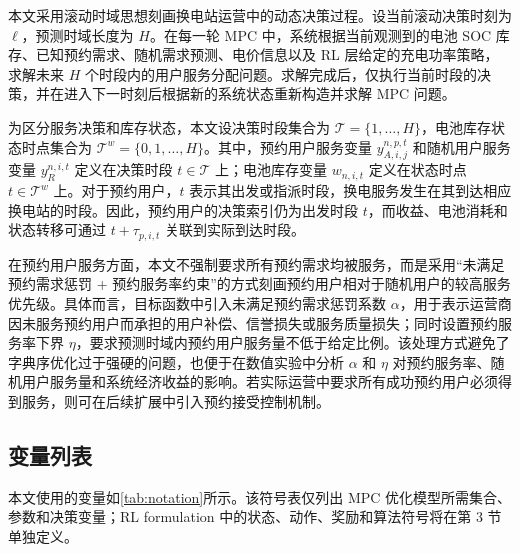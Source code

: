\documentclass[12pt,hyperref,a4paper,UTF8]{ctexart}
\begin{document}
本文采用滚动时域思想刻画换电站运营中的动态决策过程。设当前滚动决策时刻为 $\ell$，预测时域长度为 $H$。在每一轮 MPC 中，系统根据当前观测到的电池 SOC 库存、已知预约需求、随机需求预测、电价信息以及 RL 层给定的充电功率策略，求解未来 $H$ 个时段内的用户服务分配问题。求解完成后，仅执行当前时段的决策，并在进入下一时刻后根据新的系统状态重新构造并求解 MPC 问题。

为区分服务决策和库存状态，本文设决策时段集合为 $\mathcal{T}=\{1,\ldots,H\}$，电池库存状态时点集合为 $\mathcal{T}^{w}=\{0,1,\ldots,H\}$。其中，预约用户服务变量 $y_{A,i,j}^{n,p,t}$ 和随机用户服务变量 $y_R^{n,i,t}$ 定义在决策时段 $t\in\mathcal{T}$ 上；电池库存变量 $w_{n,i,t}$ 定义在状态时点 $t\in\mathcal{T}^{w}$ 上。对于预约用户，$t$ 表示其出发或指派时段，换电服务发生在其到达相应换电站的时段。因此，预约用户的决策索引仍为出发时段 $t$，而收益、电池消耗和状态转移可通过 $t+\tau_{p,i,t}$ 关联到实际到达时段。

在预约用户服务方面，本文不强制要求所有预约需求均被服务，而是采用“未满足预约需求惩罚 + 预约服务率约束”的方式刻画预约用户相对于随机用户的较高服务优先级。具体而言，目标函数中引入未满足预约需求惩罚系数 $\alpha$，用于表示运营商因未服务预约用户而承担的用户补偿、信誉损失或服务质量损失；同时设置预约服务率下界 $\eta$，要求预测时域内预约用户服务量不低于给定比例。该处理方式避免了字典序优化过于强硬的问题，也便于在数值实验中分析 $\alpha$ 和 $\eta$ 对预约服务率、随机用户服务量和系统经济收益的影响。若实际运营中要求所有成功预约用户必须得到服务，则可在后续扩展中引入预约接受控制机制。

\subsection{变量列表}

本文使用的变量如\autoref{tab:notation}所示。该符号表仅列出 MPC 优化模型所需集合、参数和决策变量；RL formulation 中的状态、动作、奖励和算法符号将在第 3 节单独定义。
\end{document}
